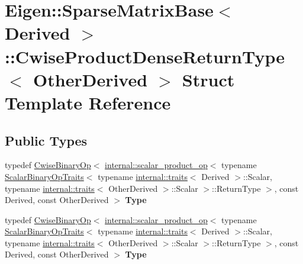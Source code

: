 \hypertarget{struct_eigen_1_1_sparse_matrix_base_1_1_cwise_product_dense_return_type}{}\section{Eigen\+:\+:Sparse\+Matrix\+Base$<$ Derived $>$\+:\+:Cwise\+Product\+Dense\+Return\+Type$<$ Other\+Derived $>$ Struct Template Reference}
\label{struct_eigen_1_1_sparse_matrix_base_1_1_cwise_product_dense_return_type}
\subsection*{Public Types}
\begin{DoxyCompactItemize}
\item 
\mbox{\label{struct_eigen_1_1_sparse_matrix_base_1_1_cwise_product_dense_return_type_a0c5232f6ca39d1d0c0af44389a87916e}} 
typedef \hyperlink{group___core___module_class_eigen_1_1_cwise_binary_op}{Cwise\+Binary\+Op}$<$ \hyperlink{struct_eigen_1_1internal_1_1scalar__product__op}{internal\+::scalar\+\_\+product\+\_\+op}$<$ typename \hyperlink{group___core___module_struct_eigen_1_1_scalar_binary_op_traits}{Scalar\+Binary\+Op\+Traits}$<$ typename \hyperlink{struct_eigen_1_1internal_1_1traits}{internal\+::traits}$<$ Derived $>$\+::Scalar, typename \hyperlink{struct_eigen_1_1internal_1_1traits}{internal\+::traits}$<$ Other\+Derived $>$\+::Scalar $>$\+::Return\+Type $>$, const Derived, const Other\+Derived $>$ {\bfseries Type}
\item 
\mbox{\label{struct_eigen_1_1_sparse_matrix_base_1_1_cwise_product_dense_return_type_a0c5232f6ca39d1d0c0af44389a87916e}} 
typedef \hyperlink{group___core___module_class_eigen_1_1_cwise_binary_op}{Cwise\+Binary\+Op}$<$ \hyperlink{struct_eigen_1_1internal_1_1scalar__product__op}{internal\+::scalar\+\_\+product\+\_\+op}$<$ typename \hyperlink{group___core___module_struct_eigen_1_1_scalar_binary_op_traits}{Scalar\+Binary\+Op\+Traits}$<$ typename \hyperlink{struct_eigen_1_1internal_1_1traits}{internal\+::traits}$<$ Derived $>$\+::Scalar, typename \hyperlink{struct_eigen_1_1internal_1_1traits}{internal\+::traits}$<$ Other\+Derived $>$\+::Scalar $>$\+::Return\+Type $>$, const Derived, const Other\+Derived $>$ {\bfseries Type}
\end{DoxyCompactItemize}


